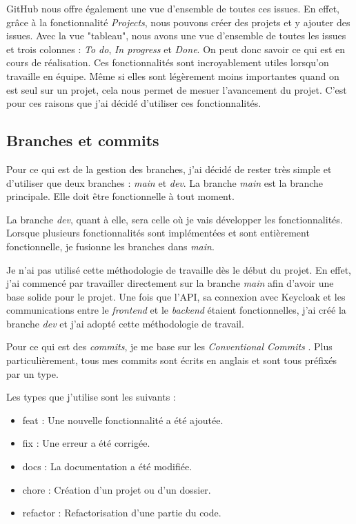 GitHub nous offre également une vue d'ensemble de toutes ces issues. En effet, grâce à la fonctionnalité \emph{Projects}, nous pouvons créer des projets et y ajouter des issues. Avec la vue "tableau", nous avons une vue d'ensemble de toutes les issues et trois colonnes : \emph{To do}, \emph{In progress} et \emph{Done}. On peut donc savoir ce qui est en cours de réalisation. Ces fonctionnalités sont incroyablement utiles lorsqu'on travaille en équipe. Même si elles sont légèrement moins importantes quand on est seul sur un projet, cela nous permet de mesuer l'avancement du projet. C'est pour ces raisons que j'ai décidé d'utiliser ces fonctionnalités.

\subsection{Branches et commits}
Pour ce qui est de la gestion des branches, j'ai décidé de rester très simple et d'utiliser que deux branches : \emph{main} et \emph{dev}. La branche \emph{main} est la branche principale. Elle doit être fonctionnelle à tout moment.

La branche \emph{dev}, quant à elle, sera celle où je vais développer les fonctionnalités. Lorsque plusieurs fonctionnalités sont implémentées et sont entièrement fonctionnelle, je fusionne les branches dans \emph{main}.

Je n'ai pas utilisé cette méthodologie de travaille dès le début du projet. En effet, j'ai commencé par travailler directement sur la branche \emph{main} afin d'avoir une base solide pour le projet. Une fois que l'API, sa connexion avec Keycloak et les communications entre le \emph{frontend} et le \emph{backend} étaient fonctionnelles, j'ai créé la branche \emph{dev} et j'ai adopté cette méthodologie de travail.

Pour ce qui est des \emph{commits}, je me base sur les \emph{Conventional Commits} \cite{ConventionalCommits}. Plus particulièrement, tous mes commits sont écrits en anglais et sont tous préfixés par un type.

Les types que j'utilise sont les suivants :
\begin{itemize}
    \item feat : Une nouvelle fonctionnalité a été ajoutée.
    \item fix : Une erreur a été corrigée.
    \item docs : La documentation a été modifiée.
    \item chore : Création d'un projet ou d'un dossier.
    \item refactor : Refactorisation d'une partie du code.
\end{itemize}

